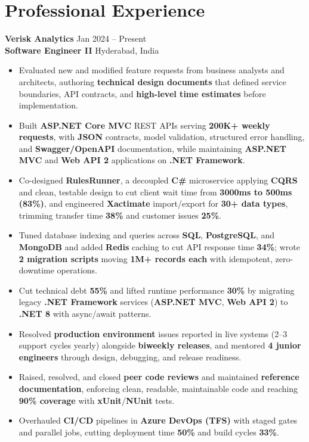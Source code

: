 \documentclass[a4paper,10pt]{article}
\begin{document}
\section*{Professional Experience}

\textbf{Verisk Analytics} \hfill Jan 2024 -- Present \\
\textbf{Software Engineer II} \hfill Hyderabad, India

\begin{itemize}[leftmargin=*]
    \item Evaluated new and modified feature requests from business analysts and architects, authoring \textbf{technical design documents} that defined service boundaries, API contracts, and \textbf{high-level time estimates} before implementation.
    \item Built \textbf{ASP.NET Core MVC} REST APIs serving \textbf{200K+ weekly requests}, with \textbf{JSON} contracts, model validation, structured error handling, and \textbf{Swagger/OpenAPI} documentation, while maintaining \textbf{ASP.NET MVC} and \textbf{Web API 2} applications on \textbf{.NET Framework}.
    \item Co-designed \textbf{RulesRunner}, a decoupled \textbf{C\#} microservice applying \textbf{CQRS} and clean, testable design to cut client wait time from \textbf{3000ms to 500ms (83\%)}, and engineered \textbf{Xactimate} import/export for \textbf{30+ data types}, trimming transfer time \textbf{38\%} and customer issues \textbf{25\%}.
    \item Tuned database indexing and queries across \textbf{SQL}, \textbf{PostgreSQL}, and \textbf{MongoDB} and added \textbf{Redis} caching to cut API response time \textbf{34\%}; wrote \textbf{2 migration scripts} moving \textbf{1M+ records each} with idempotent, zero-downtime operations.
    \item Cut technical debt \textbf{55\%} and lifted runtime performance \textbf{30\%} by migrating legacy \textbf{.NET Framework} services (\textbf{ASP.NET MVC}, \textbf{Web API 2}) to \textbf{.NET 8} with async/await patterns.
    \item Resolved \textbf{production environment} issues reported in live systems (2--3 support cycles yearly) alongside \textbf{biweekly releases}, and mentored \textbf{4 junior engineers} through design, debugging, and release readiness.
    \item Raised, resolved, and closed \textbf{peer code reviews} and maintained \textbf{reference documentation}, enforcing clean, readable, maintainable code and reaching \textbf{90\% coverage} with \textbf{xUnit}/\textbf{NUnit} tests.
    \item Overhauled \textbf{CI/CD} pipelines in \textbf{Azure DevOps (TFS)} with staged gates and parallel jobs, cutting deployment time \textbf{50\%} and build cycles \textbf{33\%}.
\end{itemize}
\end{document}
